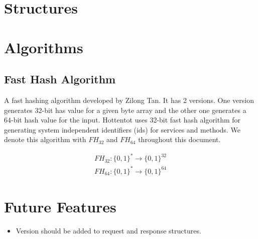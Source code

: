 \documentclass[10pt,a4paper]{article}
\begin{document}
\section{Structures}

\section{Algorithms}

\subsection{Fast Hash Algorithm}
A fast hashing algorithm developed by Zilong Tan. It has 2 versions. One version generates 32-bit has value for a given byte array and the other one generates a 64-bit hash value for the input. Hottentot uses 32-bit fast hash algorithm for generating system independent identifiers (ids) for services and methods. We denote this algorithm with $ FH_{32} $ and $ FH_{64} $ throughout this document.

\begin{equation}
\begin{split}
  FH_{32}: \{0, 1\}^* \to \{0, 1\}^{32}  \\
  FH_{64}: \{0, 1\}^* \to \{0, 1\}^{64}
\end{split}
\end{equation}


\section{Future Features}
\begin{itemize}
  \item Version should be added to request and response structures.
\end{itemize}
\end{document}
